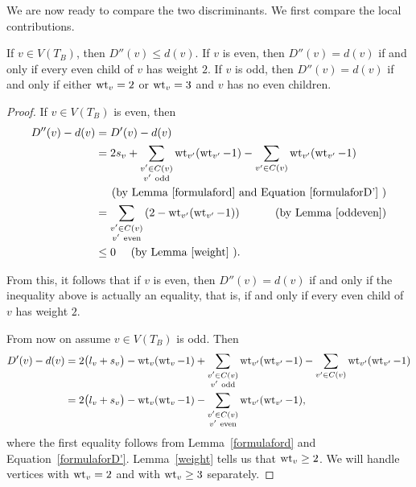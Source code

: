 We are now ready to compare the two discriminants. We first compare the local contributions.
\begin{lemma}\label{localinequality}
If $v \in V(T_B)$, then $D''(v) \leq d(v)$. If $v$ is even, then $D''(v) = d(v)$ if and only if every even child of $v$ has weight $2$. If $v$ is odd, then $D''(v) = d(v)$ if and only if either $\operatorname{wt}_v = 2$ or $\operatorname{wt}_v = 3$ and $v$ has no even children.
\end{lemma}
\begin{proof}

If $v \in V(T_B)$ is even, then
\begin{align*}
D''(v) - d(v) &= D'(v) - d(v) \\ 
&= 2s_v + \sum_{\substack{v' \in C(v) \\ v' \ \textrm{odd}}} \wt_{v'}(\wt_{v'}-1) - \sum_{v' \in C(v)} \wt_{v'}(\wt_{v'}-1) \\
& \pushright{(\textup{by Lemma~\ref{formulaford} and Equation~\ref{formulaforD'} })} \\
&= \sum_{\substack{v' \in C(v) \\ v' \ \textrm{even}}} \left( 2 - \wt_{v'}(\wt_{v'}-1)  \right) \ \ \ \ \ \ \ \ \ (\mathrm{by \ Lemma \ } {\ref{oddeven}}) \\
&\leq 0 \ \ \ \ (\textup{by Lemma~\ref{weight} }).
\end{align*}

From this, it follows that if $v$ is even, then $D''(v) = d(v)$ if and only if the inequality above is actually an equality, that is, if and only if every even child of $v$ has weight $2$.

From now on assume $v \in V(T_B)$ is odd. Then
\begin{align}\label{D'minusd}
D'(v) - d(v) 
&= 2 \big(l_v+s_v \big) -  \operatorname{wt}_v(\operatorname{wt}_v-1) + \sum_{\substack{v' \in C(v) \\ v' \ \textrm{odd}}} \operatorname{wt}_{v'}(\operatorname{wt}_{v'}-1) - \sum_{v' \in C(v)} \operatorname{wt}_{v'}(\operatorname{wt}_{v'}-1) \\
&= 2 \big(l_v+s_v \big) -  \operatorname{wt}_v(\operatorname{wt}_v-1) - \sum_{\substack{v' \in C(v) \\ v' \ \textrm{even}}} \operatorname{wt}_{v'}(\operatorname{wt}_{v'}-1) \nonumber,  
\end{align}
where the first equality follows from Lemma~\ref{formulaford} and Equation~\ref{formulaforD'}. Lemma~\ref{weight} tells us that $\operatorname{wt}_v \geq 2$. We will handle vertices with $\operatorname{wt}_v = 2$ and with $\operatorname{wt}_v \geq 3$ separately.


\end{proof}
